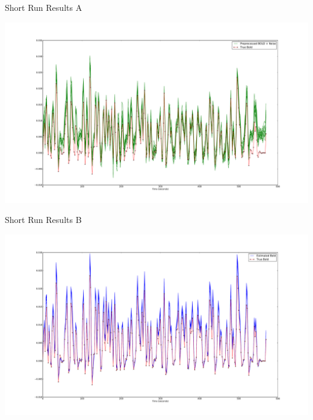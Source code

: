 \documentclass{beamer}
\begin{document}
\begin{frame}{Short Run Results A}
\begin{center}
\includegraphics[clip=true,trim=6cm 2cm 5cm 3.5cm,width=.9\textwidth]
            {preprocessed_lownoise}
\end{center}
\end{frame}

\begin{frame}{Short Run Results B}
\begin{center}
\includegraphics[clip=true,trim=6cm 2cm 5cm 3.5cm,width=.9\textwidth]
            {comparison_lownoise}
\end{center}
\end{frame}
\end{document}
